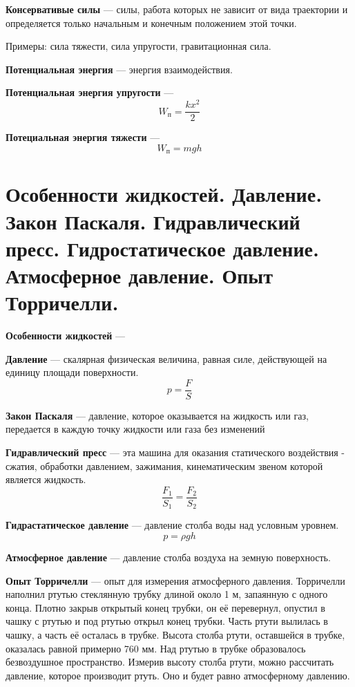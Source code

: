 \documentclass{report}
\begin{document}
{\bf Консервативые силы} ---
силы, работа которых не зависит от вида траектории и определяется только 
начальным и конечным положением этой точки.

Примеры: сила тяжести, сила упругости, гравитационная сила.

{\bf Потенциальная энергия} ---
энергия взаимодействия.

{\bf Потенциальная энергия упругости} ---
$$
W_\textrm{п}=\frac{kx^2}{2}
$$

{\bf Потециальная энергия тяжести} ---
$$
W_\textrm{п}=mgh
$$



\part{Особенности жидкостей. 
Давление. 
Закон Паскаля.
Гидравлический пресс.
Гидростатическое давление. 
Атмосферное давление. 
Опыт Торричелли.}

{\bf Особенности жидкостей} ---

{\bf Давление} ---
скалярная физическая величина, равная силе, действующей на единицу площади поверхности. 
$$
p=\frac{F}{S}
$$

{\bf Закон Паскаля} ---
давление, которое оказывается на жидкость или газ, передается в каждую точку 
жидкости или газа без изменений

{\bf Гидравлический пресс} ---
эта машина для оказания статического воздействия - 
сжатия, обработки давлением, зажимания, кинематическим звеном которой является жидкость.
$$
\frac{F_1}{S_1}=\frac{F_2}{S_2}
$$

{\bf Гидрастатическое давление} ---
давление столба воды над условным уровнем. 
$$
p=\rho gh
$$

{\bf Атмосферное давление} ---
давление столба воздуха на земную поверхность.

{\bf Опыт Торричелли} ---
опыт для измерения атмосферного давления. Торричелли наполнил ртутью 
стеклянную трубку длиной около 1 м, запаянную с одного конца. Плотно закрыв 
открытый конец трубки, он её перевернул, опустил в чашку с ртутью и под ртутью 
открыл конец трубки. Часть ртути вылилась в чашку, а часть её осталась в трубке. 
Высота столба ртути, оставшейся в трубке, оказалась равной примерно 760 мм. Над 
ртутью в трубке образовалось безвоздушное пространство.
Измерив высоту столба ртути, можно рассчитать давление, которое производит ртуть. 
Оно и будет равно атмосферному давлению.
\end{document}
